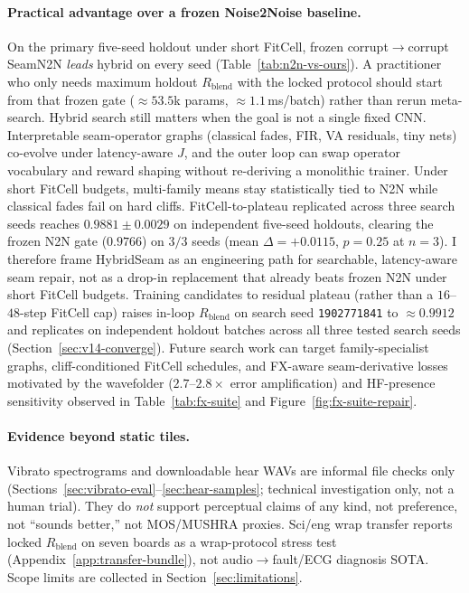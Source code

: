 \paragraph{Practical advantage over a frozen Noise2Noise baseline.}
On the primary five-seed holdout under short FitCell, frozen corrupt$\to$corrupt SeamN2N \emph{leads} hybrid on every seed (Table~\ref{tab:n2n-vs-ours}).
A practitioner who only needs maximum holdout $R_{\mathrm{blend}}$ with the locked protocol should start from that frozen gate (${\approx}53.5$k params, ${\approx}1.1$\,ms/batch) rather than rerun meta-search.
Hybrid search still matters when the goal is not a single fixed CNN. Interpretable seam-operator graphs (classical fades, FIR, VA residuals, tiny nets) co-evolve under latency-aware $J$, and the outer loop can swap operator vocabulary and reward shaping without re-deriving a monolithic trainer. Under short FitCell budgets, multi-family means stay statistically tied to N2N while classical fades fail on hard cliffs. FitCell-to-plateau replicated across three search seeds reaches $0.9881{\pm}0.0029$ on independent five-seed holdouts, clearing the frozen N2N gate ($0.9766$) on $3/3$ seeds (mean $\Delta{=}{+}0.0115$, $p{=}0.25$ at $n{=}3$).
I therefore frame HybridSeam as an engineering path for searchable, latency-aware seam repair, not as a drop-in replacement that already beats frozen N2N under short FitCell budgets.
Training candidates to residual plateau (rather than a $16$--$48$-step FitCell cap) raises in-loop $R_{\mathrm{blend}}$ on search seed \texttt{1902771841} to ${\approx}0.9912$ and replicates on independent holdout batches across all three tested search seeds (Section~\ref{sec:v14-converge}).
Future search work can target family-specialist graphs, cliff-conditioned FitCell schedules, and FX-aware seam-derivative losses motivated by the wavefolder ($2.7$--$2.8{\times}$ error amplification) and HF-presence sensitivity observed in Table~\ref{tab:fx-suite} and Figure~\ref{fig:fx-suite-repair}.

\paragraph{Evidence beyond static tiles.}
Vibrato spectrograms and downloadable hear WAVs are informal file checks only
(Sections~\ref{sec:vibrato-eval}--\ref{sec:hear-samples}; technical investigation only, not a human trial).
They do \emph{not} support perceptual claims of any kind, not preference, not ``sounds better,'' not MOS/MUSHRA proxies.
Sci/eng wrap transfer reports locked $R_{\mathrm{blend}}$ on seven boards as a wrap-protocol stress test
(Appendix~\ref{app:transfer-bundle}), not audio$\to$fault/ECG diagnosis SOTA.
Scope limits are collected in Section~\ref{sec:limitations}.

